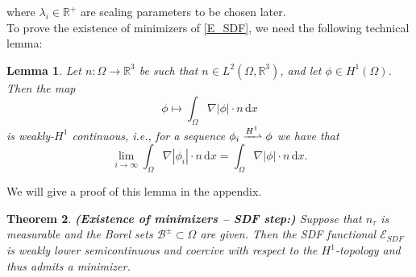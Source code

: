 \documentclass[12pt,openany]{book}
\newcommand{\R}{\mathbb{R}}
\theoremstyle{plainnormal}
\newtheorem{theorem}{Theorem}[section]
\newtheorem{lemma}[theorem]{Lemma}
\theoremstyle{remark}
\begin{document}
where $\lambda_i\in\R^+$ are scaling parameters to be chosen later.\\
To prove the existence of minimizers of \eqref{E_SDF}, we need the following technical lemma: 
\begin{lemma}\label{technicalLemma}
    Let $n: \Omega \rightarrow \R^3$ be such that $n\in L^2(\Omega, \R^3)$, and let $\phi\in H^1(\Omega)$. Then the map $$\phi \mapsto \int_\Omega \nabla |\phi|\cdot n \,\mathrm{d}x$$ is weakly-$H^1$ continuous, i.e., for a sequence $\phi_i \xrightharpoonup{H^1}\phi$ we have that $$\lim_{i\rightarrow\infty}\int_\Omega \nabla|\phi_i|\cdot n  \,\mathrm{d}x = \int_\Omega \nabla|\phi|\cdot n\,\mathrm{d}x.$$
\end{lemma}
We will give a proof of this lemma in the appendix.
\begin{theorem}\label{ProofExSDF}\textbf{(Existence of minimizers -- SDF step:)} 
Suppose that $n_\tau$ is measurable and the Borel sets $\mathcal{B}^{\pm}\subset \Omega$ are given. Then the SDF functional $\mathcal{E}_{SDF}$ is weakly lower semicontinuous and coercive with respect to the $H^1$-topology and thus admits a minimizer. 
\end{theorem}
\end{document}

